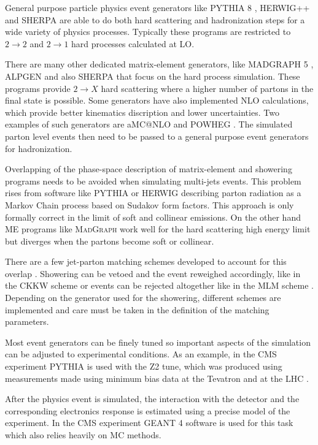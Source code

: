 General purpose particle physics event generators like \textsc{PYTHIA 8} \cite{ARTICLE:Pythia6p4PhysicsAndManual,ARTICLE:Pythia8p1Introduction}, \textsc{HERWIG++} \cite{ARTICLE:HERWIGPhysicsAndManual} and \textsc{SHERPA} \cite{ARTiCLE:SherpaEventGenerator} are able to do both hard scattering and hadronization steps for a wide variety of physics processes. Typically these programs are restricted to $2 \rightarrow 2$ and $2 \rightarrow 1$ hard processes calculated at \gls{LO}.

There are many other dedicated matrix-element generators, like \textsc{MADGRAPH 5} \cite{ARTICLE:MadGraph5}, \textsc{ALPGEN} \cite{ARTICLE:ALPGENGenerator} and also \textsc{SHERPA} that focus on the hard process simulation. These programs provide $2 \rightarrow X$ hard scattering where a higher number of partons in the final state is possible. Some generators have also implemented \gls{NLO} calculations, which provide better kinematics discription and lower uncertainties. Two examples of such generators are a\textsc{MC@NLO} \cite{ARTICLE:aMCatNLO} and \textsc{POWHEG} \cite{ARTICLE:POWHEG_2007,ARTICLE:POWHEG_2011}. The simulated parton level events then need to be passed to a general purpose event generators for hadronization. 

Overlapping of the phase-space description of matrix-element and showering programs needs to be avoided when simulating multi-jets events. This problem rises from software like \textsc{PYTHIA} or \textsc{HERWIG} describing parton radiation as a Markov Chain process based on Sudakov form factors. This approach is only formally correct in the limit of soft and collinear emissions. On the other hand \gls{ME} programs like \textsc{MadGraph} work well for the hard scattering high energy limit but diverges when the partons become soft or collinear. 

There are a few jet-parton matching schemes developed to account for this overlap \cite{ARTICLE:MatchingPartonShowersAndMatrixElements}. Showering can be vetoed and the event reweighed accordingly, like in the CKKW scheme \cite{ARTICLE:CKKWSchemeRef1,ARTICLE:CKKWSchemeRef2,ARTICLE:CKKWSchemeRef3} or events can be rejected altogether like in the MLM scheme \cite{ARTICLE:MLMScheme}. Depending on the generator used for the showering, different schemes are implemented and care must be taken in the definition of the matching parameters.

Most event generators can be finely tuned so important aspects of the simulation can be adjusted to experimental conditions. As an example, in the \gls{CMS} experiment \textsc{PYTHIA} is used with the Z2 tune, which was produced using measurements made using minimum bias data at the Tevatron and at the \gls{LHC} \cite{ARTICLE:CMSMeasurementUnderlyingEventActivity}.  

After the physics event is simulated, the interaction with the detector and the corresponding electronics response is estimated using a precise model of the experiment. In the \gls{CMS} experiment \textsc{GEANT 4} \cite{ARTICLE:GEANT4ASimulationToolkit,ARTICLE:Geant4DevelopmentsAndApplications} software is used for this task which also relies heavily on \gls{MC} methods.




